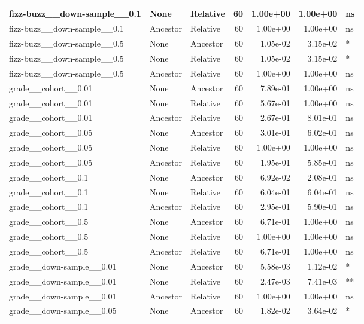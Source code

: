 \documentclass[
]{book}
\begin{document}
\begin{tabular}{l|l|l|r|r|r|l}
\hline
fizz-buzz\_\_down-sample\_\_0.1 & None & Relative & 60 & 1.00e+00 & 1.00e+00 & ns\\
\hline
fizz-buzz\_\_down-sample\_\_0.1 & Ancestor & Relative & 60 & 1.00e+00 & 1.00e+00 & ns\\
\hline
fizz-buzz\_\_down-sample\_\_0.5 & None & Ancestor & 60 & 1.05e-02 & 3.15e-02 & *\\
\hline
fizz-buzz\_\_down-sample\_\_0.5 & None & Relative & 60 & 1.05e-02 & 3.15e-02 & *\\
\hline
fizz-buzz\_\_down-sample\_\_0.5 & Ancestor & Relative & 60 & 1.00e+00 & 1.00e+00 & ns\\
\hline
grade\_\_cohort\_\_0.01 & None & Ancestor & 60 & 7.89e-01 & 1.00e+00 & ns\\
\hline
grade\_\_cohort\_\_0.01 & None & Relative & 60 & 5.67e-01 & 1.00e+00 & ns\\
\hline
grade\_\_cohort\_\_0.01 & Ancestor & Relative & 60 & 2.67e-01 & 8.01e-01 & ns\\
\hline
grade\_\_cohort\_\_0.05 & None & Ancestor & 60 & 3.01e-01 & 6.02e-01 & ns\\
\hline
grade\_\_cohort\_\_0.05 & None & Relative & 60 & 1.00e+00 & 1.00e+00 & ns\\
\hline
grade\_\_cohort\_\_0.05 & Ancestor & Relative & 60 & 1.95e-01 & 5.85e-01 & ns\\
\hline
grade\_\_cohort\_\_0.1 & None & Ancestor & 60 & 6.92e-02 & 2.08e-01 & ns\\
\hline
grade\_\_cohort\_\_0.1 & None & Relative & 60 & 6.04e-01 & 6.04e-01 & ns\\
\hline
grade\_\_cohort\_\_0.1 & Ancestor & Relative & 60 & 2.95e-01 & 5.90e-01 & ns\\
\hline
grade\_\_cohort\_\_0.5 & None & Ancestor & 60 & 6.71e-01 & 1.00e+00 & ns\\
\hline
grade\_\_cohort\_\_0.5 & None & Relative & 60 & 1.00e+00 & 1.00e+00 & ns\\
\hline
grade\_\_cohort\_\_0.5 & Ancestor & Relative & 60 & 6.71e-01 & 1.00e+00 & ns\\
\hline
grade\_\_down-sample\_\_0.01 & None & Ancestor & 60 & 5.58e-03 & 1.12e-02 & *\\
\hline
grade\_\_down-sample\_\_0.01 & None & Relative & 60 & 2.47e-03 & 7.41e-03 & **\\
\hline
grade\_\_down-sample\_\_0.01 & Ancestor & Relative & 60 & 1.00e+00 & 1.00e+00 & ns\\
\hline
grade\_\_down-sample\_\_0.05 & None & Ancestor & 60 & 1.82e-02 & 3.64e-02 & *\\

\end{tabular}
\end{document}
